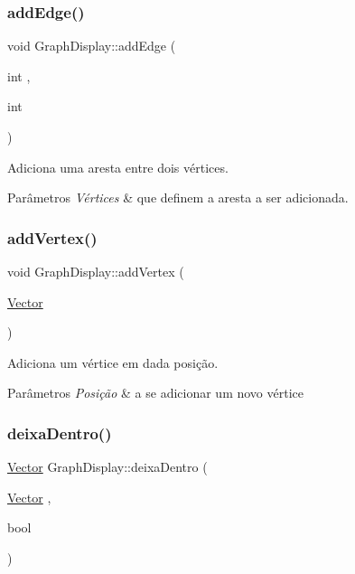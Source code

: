 \subsubsection{\texorpdfstring{addEdge()}{addEdge()}}
{\footnotesize\ttfamily void Graph\+Display\+::add\+Edge (\begin{DoxyParamCaption}\item[{int}]{,  }\item[{int}]{ }\end{DoxyParamCaption})}

Adiciona uma aresta entre dois vértices. 
\begin{DoxyParams}{Parâmetros}
{\em Vértices} & que definem a aresta a ser adicionada. \\
\hline
\end{DoxyParams}
\mbox{\label{classGraphDisplay_aaa444bf8a296fb97a054c48e8e4a826f}} 
\subsubsection{\texorpdfstring{addVertex()}{addVertex()}}
{\footnotesize\ttfamily void Graph\+Display\+::add\+Vertex (\begin{DoxyParamCaption}\item[{\mbox{\hyperlink{classVector}{Vector}}}]{ }\end{DoxyParamCaption})}

Adiciona um vértice em dada posição. 
\begin{DoxyParams}{Parâmetros}
{\em Posição} & a se adicionar um novo vértice \\
\hline
\end{DoxyParams}
\mbox{\label{classGraphDisplay_a694d361743f700a6250d578978aefab1}} 
\subsubsection{\texorpdfstring{deixaDentro()}{deixaDentro()}}
{\footnotesize\ttfamily \mbox{\hyperlink{classVector}{Vector}} Graph\+Display\+::deixa\+Dentro (\begin{DoxyParamCaption}\item[{\mbox{\hyperlink{classVector}{Vector}}}]{,  }\item[{bool}]{ }\end{DoxyParamCaption})}

